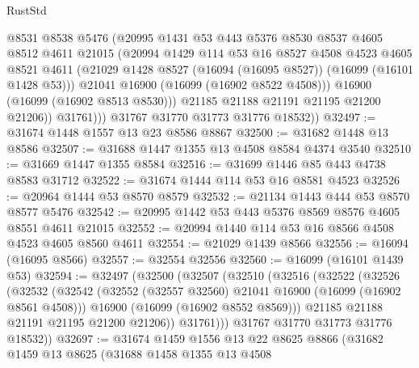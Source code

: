 \begin{lexlean}{RustStd}
\begin{coremodule}
                  @8531
                  @8538
                  @5476
                  (@20995
                    @1431
                    @53
                    @443
                    @5376
                    @8530
                    @8537
                    @4605
                    @8512
                    @4611
                    @21015
                    (@20994
                      @1429
                      @114
                      @53
                      @16
                      @8527
                      @4508
                      @4523
                      @4605
                      @8521
                      @4611
                      (@21029 @1428 @8527 (@16094 (@16095 @8527)) (@16099 (@16101 @1428 @53)))
                      @21041
                      @16900
                      (@16099 (@16902 @8522 @4508)))
                    @16900
                    (@16099 (@16902 @8513 @8530)))
                  @21185
                  @21188
                  @21191
                  @21195
                  @21200
                  @21206))
              @31761)))
        @31767
        @31770
        @31773
        @31776
        @18532))
@32497 := @31674 @1448 @1557 @13 @23 @8586 @8867
@32500 := @31682 @1448 @13 @8586
@32507 := @31688 @1447 @1355 @13 @4508 @8584 @4374 @3540
@32510 := @31669 @1447 @1355 @8584
@32516 := @31699 @1446 @85 @443 @4738 @8583 @31712
@32522 := @31674 @1444 @114 @53 @16 @8581 @4523
@32526 := @20964 @1444 @53 @8570 @8579
@32532 := @21134 @1443 @444 @53 @8570 @8577 @5476
@32542 := @20995 @1442 @53 @443 @5376 @8569 @8576 @4605 @8551 @4611 @21015
@32552 := @20994 @1440 @114 @53 @16 @8566 @4508 @4523 @4605 @8560 @4611
@32554 := @21029 @1439 @8566
@32556 := @16094 (@16095 @8566)
@32557 := @32554 @32556
@32560 := @16099 (@16101 @1439 @53)
@32594 := @32497
    (@32500
      (@32507
        (@32510
          (@32516
            (@32522
              (@32526
                (@32532
                  (@32542
                    (@32552 (@32557 @32560) @21041 @16900 (@16099 (@16902 @8561 @4508)))
                    @16900
                    (@16099 (@16902 @8552 @8569)))
                  @21185
                  @21188
                  @21191
                  @21195
                  @21200
                  @21206))
              @31761)))
        @31767
        @31770
        @31773
        @31776
        @18532))
@32697 := @31674
    @1459
    @1556
    @13
    @22
    @8625
    @8866
    (@31682
      @1459
      @13
      @8625
      (@31688
        @1458
        @1355
        @13
        @4508

\end{coremodule}
\end{lexlean}
